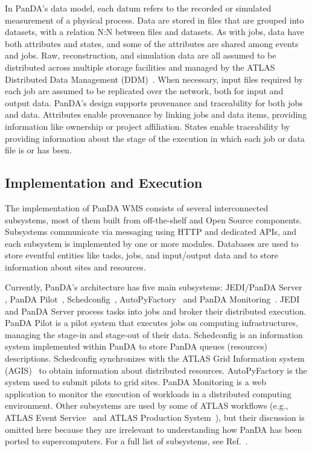 In PanDA's data model, each datum refers to the recorded or simulated
measurement of a physical process. Data are stored in files that are grouped
into datasets, with a relation N:N between files and datasets. As with jobs,
data have both attributes and states, and some of the attributes are shared
among events and jobs. Raw, reconstruction, and simulation data are all
assumed to be distributed across multiple storage facilities and managed by
the ATLAS Distributed Data Management (DDM)~\cite{garonne2012atlas}. When
necessary, input files required by each job are assumed to be replicated over
the network, both for input and output data. PanDA's design supports
provenance and traceability for both jobs and data. Attributes enable
provenance by linking jobs and data items, providing information like
ownership or project affiliation. States enable traceability by providing
information about the stage of the execution in which each job or data file
is or has been.

\subsection{Implementation and Execution}
\label{subsec:implementation}

The implementation of PanDA WMS consists of several interconnected
subsystems, most of them built from off-the-shelf and Open Source components.
Subsystems communicate via messaging using HTTP and dedicated APIs, and each
subsystem is implemented by one or more modules. Databases are used to store
eventful entities like tasks, jobs, and input/output data and to store
information about sites and resources.

Currently, PanDA's architecture has five main subsystems: JEDI/PanDA Server~
\cite{maeno2011overview,borodin2015scaling}, PanDA
Pilot~\cite{nilsson2011atlas}, Schedconfig~\cite{nilsson2008panda},
AutoPyFactory~\cite{caballero2012autopyfactory} and PanDA
Monitoring~\cite{klimentov2011atlas}. JEDI and PanDA Server process tasks
into jobs and broker their distributed execution. PanDA Pilot is a pilot
system that executes jobs on computing infrastructures, managing the stage-in
and stage-out of their data. Schedconfig is an information system implemented
within PanDA to store PanDA queues (resources) descriptions.  Schedconfig
synchronizes with the ATLAS Grid Information system
(AGIS)~\cite{anisenkov2014agis} to obtain information about distributed
resources. AutoPyFactory is the system used to submit pilots to grid sites.
PanDA Monitoring is a web application to monitor the execution of workloads
in a distributed computing environment. Other subsystems are used by some of
ATLAS workflows (e.g., ATLAS Event Service~\cite{calafiura2015atlas} and
ATLAS Production System~\cite{borodin2016atlas}), but their discussion is
omitted here because they are irrelevant to understanding how PanDA has been
ported to supercomputers. For a full list of subsystems, see
Ref.~\cite{panda-wiki_url}.

